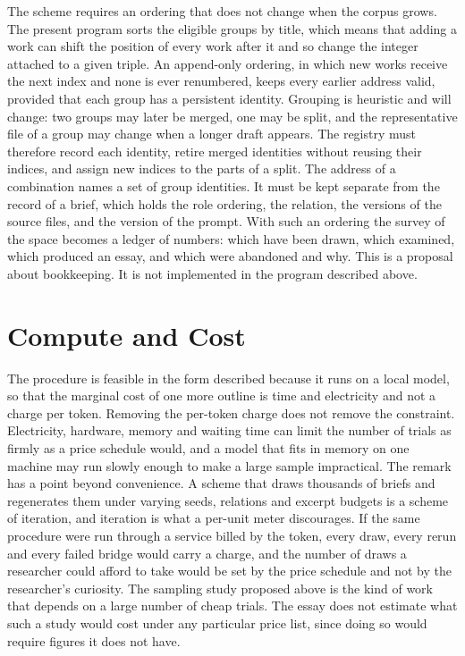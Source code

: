 \documentclass[11pt]{article}
\begin{document}
The scheme requires an ordering that does not change when the corpus grows. The present program sorts the eligible groups by title, which means that adding a work can shift the position of every work after it and so change the integer attached to a given triple. An append-only ordering, in which new works receive the next index and none is ever renumbered, keeps every earlier address valid, provided that each group has a persistent identity. Grouping is heuristic and will change: two groups may later be merged, one may be split, and the representative file of a group may change when a longer draft appears. The registry must therefore record each identity, retire merged identities without reusing their indices, and assign new indices to the parts of a split. The address of a combination names a set of group identities. It must be kept separate from the record of a brief, which holds the role ordering, the relation, the versions of the source files, and the version of the prompt. With such an ordering the survey of the space becomes a ledger of numbers: which have been drawn, which examined, which produced an essay, and which were abandoned and why. This is a proposal about bookkeeping. It is not implemented in the program described above.

\section{Compute and Cost}

The procedure is feasible in the form described because it runs on a local model, so that the marginal cost of one more outline is time and electricity and not a charge per token. Removing the per-token charge does not remove the constraint. Electricity, hardware, memory and waiting time can limit the number of trials as firmly as a price schedule would, and a model that fits in memory on one machine may run slowly enough to make a large sample impractical. The remark has a point beyond convenience. A scheme that draws thousands of briefs and regenerates them under varying seeds, relations and excerpt budgets is a scheme of iteration, and iteration is what a per-unit meter discourages. If the same procedure were run through a service billed by the token, every draw, every rerun and every failed bridge would carry a charge, and the number of draws a researcher could afford to take would be set by the price schedule and not by the researcher's curiosity. The sampling study proposed above is the kind of work that depends on a large number of cheap trials. The essay does not estimate what such a study would cost under any particular price list, since doing so would require figures it does not have.
\end{document}
